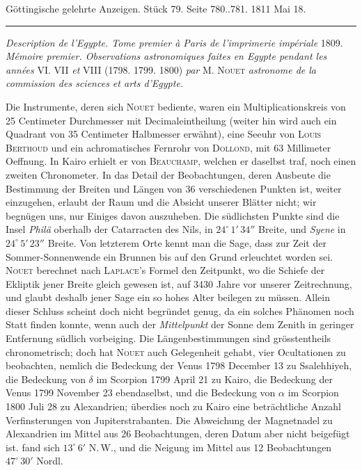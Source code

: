 \clearpage
{}
\hypertarget{native-539Nouet}{}\label{native-539Nouet}
\begin{center}\small Göttingische gelehrte Anzeigen. Stück 79. Seite 780..781. 1811 Mai 18.\\[3pt]\rule{.72\linewidth}{.3pt}\end{center}

\emph{Description de l'Egypte. Tome premier à Paris de l'imprimerie impériale} 1809. \raisebox{-0.3ex}{,}\emph{Mémoire premier. Observations astronomiques faites en Egypte pendant les années} VI. VII \emph{et} VIII (1798. 1799. 1800) \emph{par} M. \textsc{Nouet} \emph{astronome de la commission des sciences et arts d'Egypte.}

Die Instrumente, deren sich \textsc{Nouet} bediente, waren ein Multiplicationskreis von 25 Centimeter Durchmesser mit Decimaleintheilung (weiter hin wird auch ein Quadrant von 35 Centimeter Halbmesser erwähnt), eine Seeuhr von \textsc{Louis Berthoud} und ein achromatisches Fernrohr von \textsc{Dollond}, mit 63 Millimeter Oeffnung. In Kairo erhielt er von \textsc{Beauchamp}, welchen er daselbst traf, noch einen zweiten Chronometer. In das Detail der Beobachtungen, deren Ausbeute die Bestimmung der Breiten und Längen von 36 verschiedenen Punkten ist, weiter einzugehen, erlaubt der Raum und die Absicht unserer Blätter nicht; wir begnügen uns, nur Einiges davon auszuheben. Die südlichsten Punkte sind die Insel \emph{Philä} oberhalb der Catarracten des Nils, in $24^\circ\,1'\,34''$ Breite, und \emph{Syene} in $24^\circ\,5'\,23''$ Breite. Von letzterem Orte kennt man die Sage, dass zur Zeit der Sommer-Sonnenwende ein Brunnen bis auf den Grund erleuchtet worden sei. \textsc{Nouet} berechnet nach \textsc{Laplace}'s Formel den Zeitpunkt, wo die Schiefe der Ekliptik jener Breite gleich gewesen ist, auf 3430 Jahre vor unserer Zeitrechnung, und glaubt deshalb jener Sage ein so hohes Alter beilegen zu müssen. Allein dieser Schluss scheint doch nicht begründet genug, da ein solches Phänomen noch Statt finden konnte, wenn auch der \emph{Mittelpunkt} der Sonne dem Zenith in geringer Entfernung südlich vorbeiging. Die Längenbestimmungen sind grösstentheils chronometrisch; doch hat \textsc{Nouet} auch Gelegenheit gehabt, vier Ocultationen zu beobachten, nemlich die Bedeckung der Venus 1798 December 13 zu Ssalehhiyeh, die Bedeckung von $\delta$ im Scorpion 1799 April 21 zu Kairo, die Bedeckung der Venus 1799 November 23 ebendaselbst, und die Bedeckung von $\alpha$ im Scorpion 1800 Juli 28 zu Alexandrien; überdies noch zu Kairo eine beträchtliche Anzahl Verfinsterungen von Jupiterstrabanten. Die Abweichung der Magnetnadel zu Alexandrien im Mittel aus 26 Beobachtungen, deren Datum aber nicht beigefügt ist. fand sich $13^\circ\,6'$ N.\,W., und die Neigung im Mittel aus 12 Beobachtungen $47^\circ\,30'$ Nordl.
